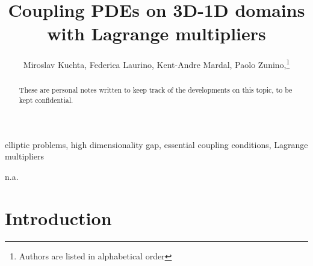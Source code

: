\documentclass[r]{siamart171218}
\title{Coupling PDEs on 3D-1D domains with Lagrange multipliers}
\author{Miroslav Kuchta, Federica Laurino, Kent-Andre Mardal, Paolo Zunino,\thanks{Authors are listed in alphabetical order}}
\begin{document}
\maketitle

\begin{abstract}
These are personal notes written to keep track of the developments on this topic, to be kept confidential.
\end{abstract}

\begin{keywords}
elliptic problems, high dimensionality gap, essential coupling conditions, Lagrange multipliers
\end{keywords}

\begin{AMS}
n.a.
\end{AMS}

 

\def\ud{u_{\odot}}
\def\udh{u_{\odot, h}}
\def\vd{v_{\odot}}
\def\uf{u_{\ominus}}
\def\up{u_{\oplus}}
\def\eps{\epsilon}
\def\nn{\boldsymbol n}
\def\rr{\boldsymbol r}
\def\RR{\boldsymbol R}
\def\kk{\boldsymbol k}
\def\ss{\boldsymbol s}
\def\uu{\boldsymbol u}
\def\vv{\boldsymbol v}
\def\xx{\boldsymbol x}
\def\bu{\overline{u}}
\def\bv{\overline{v}}
\def\tu{\widetilde{u}}
\def\tv{\widetilde{v}}
\def\TT{\boldsymbol T}
\def\NN{\boldsymbol N}
\def\BB{\boldsymbol B}
\def\ttu{\widetilde{\widetilde{u}}}
\def\ttv{\widetilde{\widetilde{v}}}
\def\cv{\check{v}}
\def\mesh{{\cal T}^h}
\def\ball{{\cal B}}
\def\R{\mathbb{R}}
\def\D{\mathcal{D}}
\def\DD{\partial\mathcal{D}}
\def\trace{\overline{\mathcal{R}}}
\def\ext{\mathcal{E}}
\def\ide{\mathcal{I}}
\def\ii{\hat{\imath}}
\newcommand{\avrd}[1]{\overline{\overline{#1}}}
\newcommand{\avrc}[1]{\overline{#1}}
\newcommand{\refe}[1]{{#1}_{\mathrm{ref}}}
\newcommand{\norm}[1]{\lVert{#1}\rVert}

\newcommand{\vertiii}[1]{{\left\vert\kern-0.25ex\left\vert\kern-0.25ex\left\vert #1 
    \right\vert\kern-0.25ex\right\vert\kern-0.25ex\right\vert}}

\newtheorem{thm}{Theorem}[section]
\newtheorem{prop}{Property}[section]
\theoremstyle{remark}
\newtheorem{remark}{Remark}[section]
 
\section{Introduction}\label{sec:intro}
\end{document}

